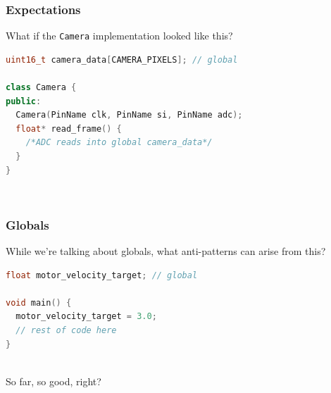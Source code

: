 \documentclass{beamer}
\begin{document}
\begin{frame}[fragile]
\frametitle{Expectations}
What if the \texttt{Camera} implementation looked like this?
\hfill \\
\begin{lstlisting}[language=C++,basicstyle=\ttfamily\scriptsize]
uint16_t camera_data[CAMERA_PIXELS]; // global

class Camera {
public:
  Camera(PinName clk, PinName si, PinName adc);
  float* read_frame() {
    /*ADC reads into global camera_data*/
  }
}
\end{lstlisting}
\hfill \\
\end{frame}


\begin{frame}[fragile]
\frametitle{Globals}
While we're talking about globals, what anti-patterns can arise from this?
\hfill \\
\begin{lstlisting}[language=C++,basicstyle=\ttfamily\scriptsize]
float motor_velocity_target; // global

void main() {
  motor_velocity_target = 3.0;
  // rest of code here
}
\end{lstlisting}
\hfill \\
So far, so good, right? \\
\hfill \\
\hfill \\
\end{frame}
\end{document}
